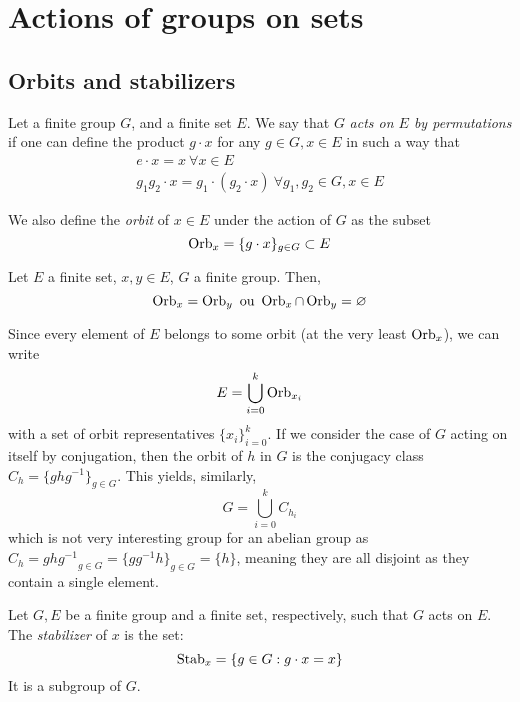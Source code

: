\section{Actions of groups on sets}
\subsection{Orbits and stabilizers}
\begin{definition}
  Let a finite group $G$, and a finite set $E$. We say that $G$ \emph{acts on $E$ by permutations} if one can define the product $g \cdot x$ for any $g \in G, x \in E$ in such a way that
  \begin{gather*}
    e \cdot x = x\ \forall x \in E \\
    g_1g_2 \cdot x = g_1 \cdot (g_2 \cdot x) \ \forall g_1, g_2 \in G, x \in E
  \end{gather*}

  We also define the \emph{orbit} of $x \in E$ under the action of $G$ as the subset \[\operatorname{Orb}_x = \{g \cdot x\}_{g \in G} \subset E\]
\end{definition}

\begin{theorem*}\label{disjointorb}
  Let $E$ a finite set, $x, y \in E$, $G$ a finite group. Then, 
  \[
    \operatorname{Orb}_x = \operatorname{Orb}_y \text{ ou } \operatorname{Orb}_x \cap \operatorname{Orb}_y = \varnothing
  \]
\end{theorem*}

Since every element of $E$ belongs to some orbit (at the very least $\operatorname{Orb}_x$), we can write 
\[
  E = \bigcup_{i = 0}^{k} \operatorname{Orb}_{x_i}
\]
with a set of orbit representatives $\{x_i\}_{i = 0}^k$. If we consider the case of $G$ acting on itself by conjugation, then the orbit of $h$ in $G$ is the conjugacy class $C_h = \{ghg^{-1}\}_{g \in G}$. This yields, similarly, 
\[
  G = \bigcup_{i = 0}^k C_{h_i}
\]
which is not very interesting group for an abelian group as $C_h = {ghg^{-1}}_{g \in G} = \{gg^{-1}h\}_{g \in G} = \{h\}$, meaning they are all disjoint as they contain a single element.

\begin{definition}
  Let $G, E$ be a finite group and a finite set, respectively, such that $G$ acts on $E$. The \emph{stabilizer} of $x$ is the set: 
  \[
    \operatorname{Stab}_x = \{g \in G: g \cdot x = x\}
  \]
  It is a subgroup of $G$. 
\end{definition}

